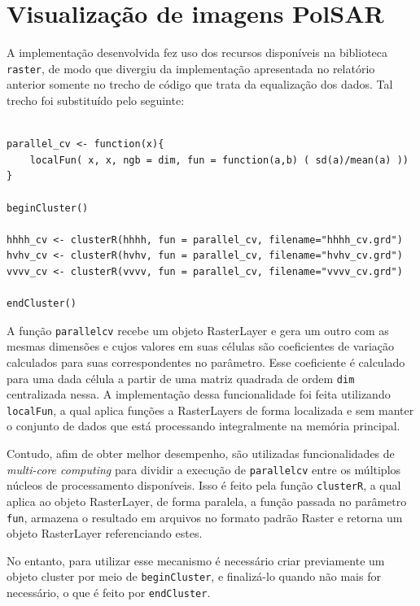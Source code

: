 \documentclass[12pt]{article}
\begin{document}
\section{Visualização de imagens PolSAR}

A implementação desenvolvida fez uso dos recursos disponíveis na biblioteca \texttt{raster}, de modo que divergiu da implementação apresentada no relatório anterior somente no trecho de código que trata da equalização dos dados. Tal trecho foi substituído pelo seguinte:

\begin{verbatim}

parallel_cv <- function(x){ 
    localFun( x, x, ngb = dim, fun = function(a,b) ( sd(a)/mean(a) ))
}

beginCluster()

hhhh_cv <- clusterR(hhhh, fun = parallel_cv, filename="hhhh_cv.grd")
hvhv_cv <- clusterR(hvhv, fun = parallel_cv, filename="hvhv_cv.grd")
vvvv_cv <- clusterR(vvvv, fun = parallel_cv, filename="vvvv_cv.grd")

endCluster()

\end{verbatim}

A função \texttt{parallel}\textunderscore\texttt{cv} recebe um objeto RasterLayer e gera um outro com as mesmas dimensões e cujos valores em suas células são coeficientes de variação calculados para suas correspondentes no parâmetro. Esse coeficiente é calculado para uma dada célula a partir de uma matriz quadrada de ordem \texttt{dim} centralizada nessa. A implementação dessa funcionalidade foi feita utilizando \texttt{localFun}, a qual aplica funções a RasterLayers de forma localizada e sem manter o conjunto de dados que está processando integralmente na memória principal.

Contudo, afim de obter melhor desempenho, são utilizadas funcionalidades de \textit{multi-core computing} para dividir a execução de \texttt{parallel}\textunderscore\texttt{cv} entre os múltiplos núcleos de processamento disponíveis. Isso é feito pela função \texttt{clusterR}, a qual aplica ao objeto RasterLayer, de forma paralela, a função passada no parâmetro \texttt{fun}, armazena o resultado em arquivos no formato padrão Raster e retorna um objeto RasterLayer referenciando estes.

No entanto, para utilizar esse mecanismo é necessário criar previamente um objeto cluster por meio de \texttt{beginCluster}, e finalizá-lo quando não mais for necessário, o que é feito por \texttt{endCluster}.
\end{document}
